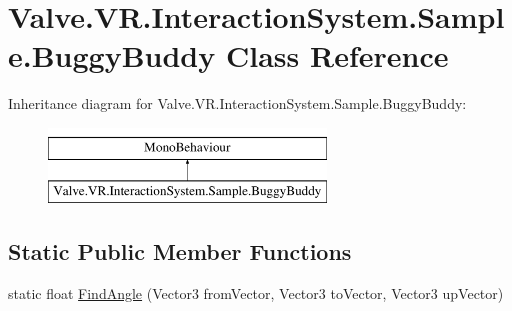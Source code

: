 \hypertarget{class_valve_1_1_v_r_1_1_interaction_system_1_1_sample_1_1_buggy_buddy}{}\section{Valve.\+V\+R.\+Interaction\+System.\+Sample.\+Buggy\+Buddy Class Reference}
\label{class_valve_1_1_v_r_1_1_interaction_system_1_1_sample_1_1_buggy_buddy}
Inheritance diagram for Valve.\+V\+R.\+Interaction\+System.\+Sample.\+Buggy\+Buddy\+:\begin{figure}[H]
\begin{center}
\leavevmode
\includegraphics[height=2.000000cm]{class_valve_1_1_v_r_1_1_interaction_system_1_1_sample_1_1_buggy_buddy}
\end{center}
\end{figure}
\subsection*{Static Public Member Functions}
\begin{DoxyCompactItemize}
\item 
static float \mbox{\hyperlink{class_valve_1_1_v_r_1_1_interaction_system_1_1_sample_1_1_buggy_buddy_a8abf825f7278839e55df1de8b098867b}{Find\+Angle}} (Vector3 from\+Vector, Vector3 to\+Vector, Vector3 up\+Vector)
\end{DoxyCompactItemize}
